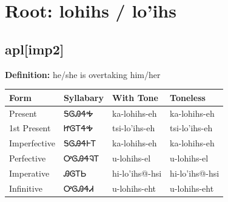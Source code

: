 \documentclass{article}%
\begin{document}
%
\normalsize%
\section*{Root: lohihs / lo'ihs}%
\subsection*{apl[imp2]}%
\textbf{Definition: }%
he/she is overtaking him/her%
\\[0.5em]%
\begin{tabular}{|l|l|l|l|}%
\hline%
\textbf{Form}&\textbf{Syllabary}&\textbf{With Tone}&\textbf{Toneless}\\%
\hline%
Present&ᎦᎶᎯᏎᎭ&ka{-}lohihs{-}eh&ka{-}lohihs{-}eh\\%
1st Present&ᏥᎶᎢᏎᎭ&tsi{-}lo'ihs{-}eh&tsi{-}lo'ihs{-}eh\\%
Imperfective&ᎦᎶᎯᏎᎰᎢ&ka{-}lohihs{-}eh&ka{-}lohihs{-}eh\\%
Perfective&ᎤᎶᎯᏎᎸᎢ&u{-}lohihs{-}el&u{-}lohihs{-}el\\%
Imperative&ᎯᎶᎢᏏ&hi{-}lo'ihs@{-}hsi&hi{-}lo'ihs@{-}hsi\\%
Infinitive&ᎤᎶᎯᏎᏗ&u{-}lohihs{-}eht&u{-}lohihs{-}eht\\%
\hline%
\end{tabular}%
\\[1em]%
\end{document}

